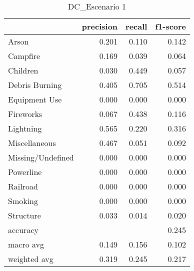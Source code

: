 \begin{table}
\centering
\caption{DC_Escenario 1}
\label{tab:Reporte de clasificación para el Escenario 1 utilizando Discriminante Cuadrático}
\begin{tabular}{lrrr}
\toprule
{} &  precision &  recall &  f1-score \\
\midrule
Arson             &      0.201 &   0.110 &     0.142 \\
Campfire          &      0.169 &   0.039 &     0.064 \\
Children          &      0.030 &   0.449 &     0.057 \\
Debris Burning    &      0.405 &   0.705 &     0.514 \\
Equipment Use     &      0.000 &   0.000 &     0.000 \\
Fireworks         &      0.067 &   0.438 &     0.116 \\
Lightning         &      0.565 &   0.220 &     0.316 \\
Miscellaneous     &      0.467 &   0.051 &     0.092 \\
Missing/Undefined &      0.000 &   0.000 &     0.000 \\
Powerline         &      0.000 &   0.000 &     0.000 \\
Railroad          &      0.000 &   0.000 &     0.000 \\
Smoking           &      0.000 &   0.000 &     0.000 \\
Structure         &      0.033 &   0.014 &     0.020 \\
accuracy          &            &         &     0.245 \\
macro avg         &      0.149 &   0.156 &     0.102 \\
weighted avg      &      0.319 &   0.245 &     0.217 \\
\bottomrule
\end{tabular}
\end{table}
